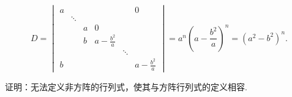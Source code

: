 \begin{exercise}
\begin{exgroup}
\begin{answer}
\begin{enumerate}
                    \[
                        D = \begin{vmatrix}
                            a &         &   &                   &         & 0                 \\
                              & \ddots  &   &                   &         &                   \\
                              &         & a & 0                 &         &                   \\
                              &         & b & a - \frac{b^2}{a} &         &                   \\
                              &         &   &                   & \ddots  &                   \\
                            b &         &   &                   &         & a - \frac{b^2}{a}
                        \end{vmatrix}
                        = a^n (a - \frac{b^2}{a})^n
                        = (a^2 - b^2)^n.
                    \]
            \end{enumerate}
        \end{answer}
    \end{exgroup}

    \begin{exgroup}
        \item 证明：无法定义非方阵的行列式，使其与方阵行列式的定义相容.
        \begin{answer}

        \end{answer}


\end{exgroup}
\end{exercise}
